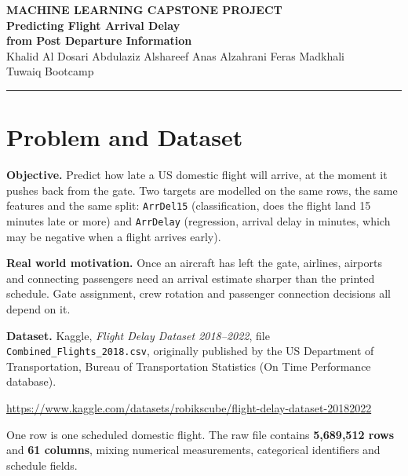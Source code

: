 \documentclass[11pt,a4paper]{article}
\newcommand{\metric}[1]{\textbf{\color{deep}#1}}
\begin{document}
\begin{center}
    {\large\color{lilac}\bfseries MACHINE LEARNING CAPSTONE PROJECT}\\[0.8em]
    {\LARGE\bfseries\color{deep} Predicting Flight Arrival Delay}\\[0.35em]
    {\LARGE\bfseries\color{deep} from Post Departure Information}\\[1.0em]
    {\normalsize Khalid Al Dosari \quad\textbullet\quad Abdulaziz Alshareef
     \quad\textbullet\quad Anas Alzahrani \quad\textbullet\quad Feras Madkhali}\\[0.4em]
    {\small Tuwaiq Bootcamp}
\end{center}
\vspace{0.6em}
\hrule
\vspace{1.2em}

\section{Problem and Dataset}

\textbf{Objective.} Predict how late a US domestic flight will arrive, at the moment it
pushes back from the gate. Two targets are modelled on the same rows, the same features
and the same split: \texttt{ArrDel15} (classification, does the flight land 15 minutes
late or more) and \texttt{ArrDelay} (regression, arrival delay in minutes, which may be
negative when a flight arrives early).

\textbf{Real world motivation.} Once an aircraft has left the gate, airlines, airports
and connecting passengers need an arrival estimate sharper than the printed schedule.
Gate assignment, crew rotation and passenger connection decisions all depend on it.

\textbf{Dataset.} Kaggle, \emph{Flight Delay Dataset 2018--2022}, file
\texttt{Combined\_Flights\_2018.csv}, originally published by the US Department of
Transportation, Bureau of Transportation Statistics (On Time Performance database).

\begin{center}
\small\url{https://www.kaggle.com/datasets/robikscube/flight-delay-dataset-20182022}
\end{center}

One row is one scheduled domestic flight. The raw file contains \metric{5{,}689{,}512
rows} and \metric{61 columns}, mixing numerical measurements, categorical identifiers
and schedule fields.
\end{document}
